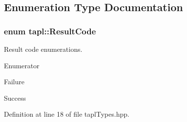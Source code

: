\subsection{Enumeration Type Documentation}
\subsubsection[{\texorpdfstring{Result\+Code}{ResultCode}}]{\setlength{\rightskip}{0pt plus 5cm}enum {\bf tapl\+::\+Result\+Code}}\hypertarget{namespacetapl_a196ce1d5bf399fc26f03797e6a8d03ff}{}\label{namespacetapl_a196ce1d5bf399fc26f03797e6a8d03ff}


Result code enumerations. 

\begin{Desc}
\item[Enumerator]\par
\begin{description}
\item[{\em 
F\+A\+I\+L\+U\+RE\hypertarget{namespacetapl_a196ce1d5bf399fc26f03797e6a8d03ffaa6e243674a964518a62bdda7f20f6453}{}\label{namespacetapl_a196ce1d5bf399fc26f03797e6a8d03ffaa6e243674a964518a62bdda7f20f6453}
}]Failure \item[{\em 
S\+U\+C\+C\+E\+SS\hypertarget{namespacetapl_a196ce1d5bf399fc26f03797e6a8d03ffafbdd78b1e8654e11461f37fea68c6195}{}\label{namespacetapl_a196ce1d5bf399fc26f03797e6a8d03ffafbdd78b1e8654e11461f37fea68c6195}
}]Success \end{description}
\end{Desc}


Definition at line 18 of file tapl\+Types.\+hpp.

